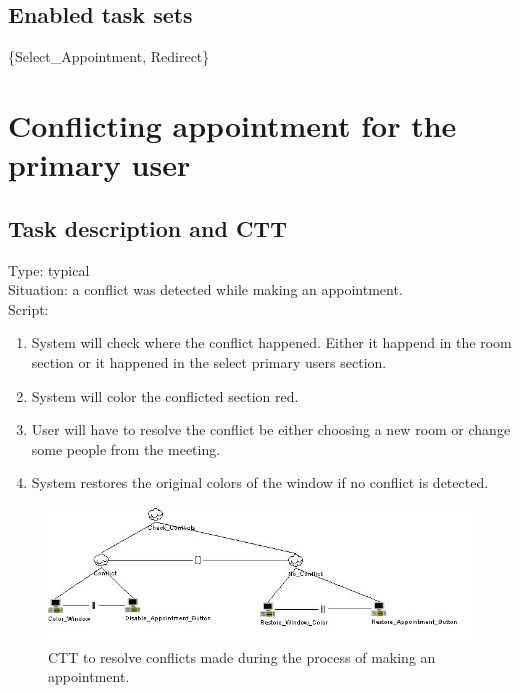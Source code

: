 \documentclass[11pt, a4paper,svglistings]{report}
\begin{document}
\subsection{Enabled task sets}

\{Select\_Appointment, Redirect\}


\newpage

\section{Conflicting appointment for the primary user}

\subsection{Task description and CTT}

\label{subsec:conflictPrimary}Type: typical \\
Situation: a conflict was detected while making an appointment. \\
Script:
\begin{enumerate}
\item System will check where the conflict happened. Either it happend in the room section or it happened in the select primary users section.
\item System will color the conflicted section red.
\item User will have to resolve the conflict be either choosing a new room or change some people from the meeting.
\item System restores the original colors of the window if no conflict is detected.
\end{enumerate}

\begin{figure}[H]
\centering
    \includegraphics[width=1\textwidth]{CTTxml/Conflict.jpg}
  \caption[Conflicting appointment]{\label{fig:ConflictingAppointment}CTT to resolve conflicts made during the process of making an appointment.}
\end{figure}
\end{document}
